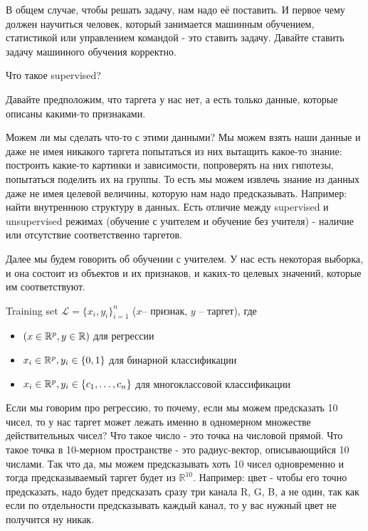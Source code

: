 В общем случае, чтобы решать задачу, нам надо её поставить. И первое чему должен научиться человек, который занимается машинным обучением, статистикой или управлением командой - это ставить задачу. Давайте ставить задачу машинного обучения корректно.


Что такое supervised?

Давайте предположим, что таргета у нас нет, а есть только данные, которые описаны какими-то признаками.

Можем ли мы сделать что-то с этими данными? Мы можем взять наши данные и даже не имея никакого таргета попытаться из них вытащить какое-то знание: построить какие-то картинки и зависимости, попроверять на
них гипотезы, попытаться поделить их на группы. То есть мы можем извлечь знание из данных даже не имея
целевой величины, которую нам надо предсказывать. Например: найти внутреннюю структуру в данных. Есть
отличие между supervised и unsupervised режимах (обучение с учителем и обучение без учителя) - наличие
или отсутствие соответственно таргетов.


Далее мы будем говорить об обучении с учителем. У нас есть некоторая выборка, и она состоит из объектов
и их признаков, и каких-то целевых значений, которые им соответствуют.

\begin{definition}
    Training set $\mathcal{L} = \{ x_i, y_i \}_{i=1}^{n}$ ($x$-- признак, $y$ -- таргет), где
    \begin{itemize}
        \item $(x \in \mathbb{R}^p, y \in \mathbb{R})$ для регрессии
        \item $x_i \in \mathbb{R}^p, y_i \in \{ 0, 1 \}$ для бинарной классификации
        \item $x_i \in \mathbb{R}^p, y_i \in \{ c_1, \ldots, c_n \}$ для многоклассовой классификации
    \end{itemize}
\end{definition}



Если мы говорим про регрессию, то  почему, если мы можем предсказать 10 чисел, то у нас таргет может лежать именно в одномерном множестве действительных чисел? Что такое число - это точка на числовой прямой. Что такое точка в 10-мерном
пространстве - это радиус-вектор, описывающийся 10 числами. Так что да, мы можем предсказывать хоть 10
чисел одновременно и тогда предсказываемый таргет будет из $\mathbb{R}^{10}$. Например: цвет - чтобы его точно предсказать, надо будет предсказать сразу три канала R, G, B, а не один, так как если по отдельности предсказывать
каждый канал, то у вас нужный цвет не получится ну никак.


